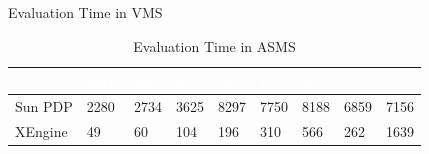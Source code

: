\begin{table}[t]
\caption{Evaluation Time in VMS}
\label{table:VMSeval}
\vspace{5 mm}
\centering
\begin{tabular}{|l|l|l|l|l|l|l|l|l|}   
\hline  \rowcolor{black} \scriptsize \bf \textcolor {white}{}
& \scriptsize \bf \textcolor {white}{SAR}
& \scriptsize \bf \textcolor {white}{AR}
& \scriptsize \bf \textcolor  {white}{SA}
& \scriptsize \bf \textcolor  {white}{SR}
& \scriptsize \bf \textcolor  {white}{R}
& \scriptsize \bf \textcolor  {white}{S} 
& \scriptsize \bf \textcolor  {white}{A}
& \scriptsize \bf \textcolor {white}{IA}\\ \hline
\scriptsize  {Sun PDP  }
& \scriptsize  {2280}
& \scriptsize {2734}
& \scriptsize {3625}
& \scriptsize {8297}
& \scriptsize {7750}
& \scriptsize {8188}
& \scriptsize {6859}
& \scriptsize {7156}
  \\ \hline
\scriptsize  {XEngine}
& \scriptsize  {49}
& \scriptsize {60}
& \scriptsize {104}
& \scriptsize {196}
& \scriptsize {310}
& \scriptsize {566}
& \scriptsize {262}
& \scriptsize {1639}
  \\ \hline
\end{tabular}
\caption{Evaluation Time in ASMS}
\label{table:ASMSeval}
\end{table}

